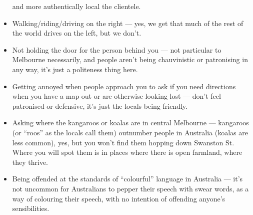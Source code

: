 \begin{itemize}
  and more authentically local the clientele.
\item Walking/riding/driving on the right --- yes, we get that much of
  the rest of the world drives on the left, but we don't.
\item Not holding the door for the person behind you --- not particular
  to Melbourne necessarily, and people aren't being chauvinistic or
  patronising in any way, it's just a politeness thing here.
\item Getting annoyed when people approach you to ask if you need
  directions when you have a map out or are otherwise looking lost ---
  don't feel patronised or defensive, it's just the locals being
  friendly.
\item Asking where the kangaroos or koalas are in central Melbourne ---
  kangaroos (or ``roos'' as the locals call them) outnumber people in
  Australia (koalas are less common), yes, but you won't find them
  hopping down Swanston St. Where you will spot them is in places where
  there is open farmland, where they thrive.
\item Being offended at the standards of ``colourful'' language in
  Australia --- it's not uncommon for Australians to pepper their speech
  with swear words, as a way of colouring their speech, with no
  intention of offending anyone's sensibilities.
\end{itemize}


